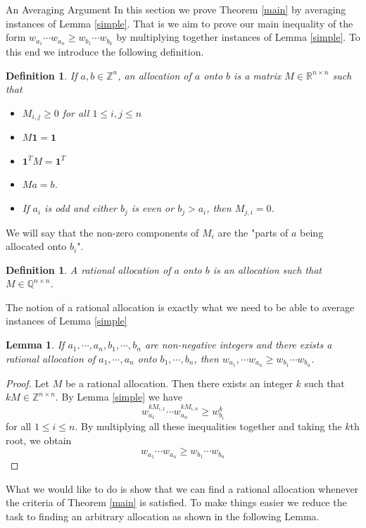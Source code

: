 \documentclass[11pt,a4paper]{article}
\newcounter{foo}
\newtheorem{lemma}[subsection]{Lemma}
\newtheorem{definition}[foo]{Definition}
\begin{document}
\begin{section}{An Averaging Argument} \label{sec3}
In this section we prove Theorem \ref{main} by averaging instances of Lemma \ref{simple}. That is we aim to prove our main inequality of the form $w_{a_1} \cdots w_{a_n} \geq w_{b_1} \cdots w_{b_k}$ by multiplying together instances of Lemma \ref{simple}. To this end we introduce the following definition.
\begin{definition} If $a, b \in \mathbb{Z}^n$, an \textit{allocation} of $a$ onto $b$ is a matrix $M \in \mathbb{R}^{n \times n}$ such that
\begin{itemize}
\item $ M_{i, j} \geq 0$ for all $1 \leq i, j \leq n$
\item $ M \boldsymbol{1} = \boldsymbol{1}$
\item $ \boldsymbol{1}^T M = \boldsymbol{1}^T$
\item $ M a = b$.
\item If $a_i$ is odd and either $b_j$ is even or $b_j > a_i$, then $M_{j, i} = 0$.
\end{itemize}
\end{definition}
We will say that the non-zero components of $M_i$ are the "parts of $a$ being allocated onto $b_i$".
\begin{definition} A \textit{rational allocation} of $a$ onto $b$ is an allocation such that $M \in \mathbb{Q}^{n \times n}$.
\end{definition}
The notion of a rational allocation is exactly what we need to be able to average instances of Lemma \ref{simple}
\begin{lemma} \label{rational_allocation_implies_theorem} If $a_1, \cdots, a_n, b_1, \cdots, b_n$ are non-negative integers and there exists a rational allocation of $a_1, \cdots, a_n$ onto $b_1, \cdots, b_n$, then $w_{a_1}, \cdots w_{a_n} \geq w_{b_1} \cdots w_{b_n}$.
\end{lemma}
\begin{proof} Let $M$ be a rational allocation. Then there exists an integer $k$ such that $k M \in \mathbb{Z}^{n \times n}$. By Lemma \ref{simple} we have
\[
w_{a_1}^{ k M_{i, 1} } \cdots w_{a_n}^{k M_{i, n} } \geq w_{b_i}^k
\]
for all $1 \leq i \leq n$. By multiplying all these inequalities together and taking the $k$th root, we obtain
\[
w_{a_1} \cdots w_{a_n} \geq w_{b_1} \cdots w_{b_n}
\]
\end{proof}
What we would like to do is show that we can find a rational allocation whenever the criteria of Theorem \ref{main} is satisfied. To make things easier we reduce the task to finding an arbitrary allocation as shown in the following Lemma.

\end{section}
\end{document}

